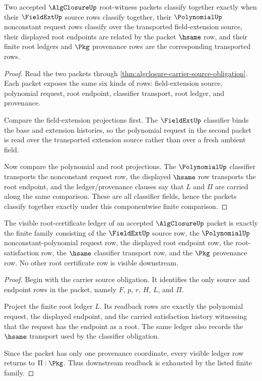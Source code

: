 \begin{theorem}
\label{thm:algclosure-polynomial-root-classifier-obligation}
Two accepted $\AlgClosureUp$ root-witness packets classify together exactly
when their $\FieldExtUp$ source rows classify together, their $\PolynomialUp$
nonconstant request rows classify over the transported field-extension source,
their displayed root endpoints are related by the packet $\hsame$ row, and
their finite root ledgers and $\Pkg$ provenance rows are the corresponding
transported rows.
\end{theorem}
\begin{proof}
Read the two packets through
\autoref{thm:algclosure-carrier-source-obligation}. Each packet exposes the
same six kinds of rows: field-extension source, polynomial request, root
endpoint, classifier transport, root ledger, and provenance.

Compare the field-extension projections first. The $\FieldExtUp$ classifier
binds the base and extension histories, so the polynomial request in the second
packet is read over the transported extension source rather than over a fresh
ambient field.

Now compare the polynomial and root projections. The $\PolynomialUp$ classifier
transports the nonconstant request row, the displayed $\hsame$ row transports
the root endpoint, and the ledger/provenance clauses say that $L$ and $\Pi$ are
carried along the same comparison. These are all classifier fields, hence the
packets classify together exactly under this componentwise finite comparison.
\end{proof}

\begin{theorem}
\label{thm:algclosure-ledger-readback-obligation}
The visible root-certificate ledger of an accepted $\AlgClosureUp$ packet is
exactly the finite family consisting of the $\FieldExtUp$ source row, the
$\PolynomialUp$ nonconstant-polynomial request row, the displayed root endpoint
row, the root-satisfaction row, the $\hsame$ classifier transport row, and the
$\Pkg$ provenance row. No other root certificate row is visible downstream.
\end{theorem}
\begin{proof}
Begin with the carrier source obligation. It identifies the only source and
endpoint rows in the packet, namely $F$, $p$, $r$, $H$, $L$, and $\Pi$.

Project the finite root ledger $L$. Its readback rows are exactly the
polynomial request, the displayed endpoint, and the carried satisfaction
history witnessing that the request has the endpoint as a root. The same ledger
also records the $\hsame$ transport used by the classifier obligation.

Since the packet has only one provenance coordinate, every visible ledger row
returns to $\Pi:\Pkg$. Thus downstream readback is exhausted by the listed
finite family.
\end{proof}

